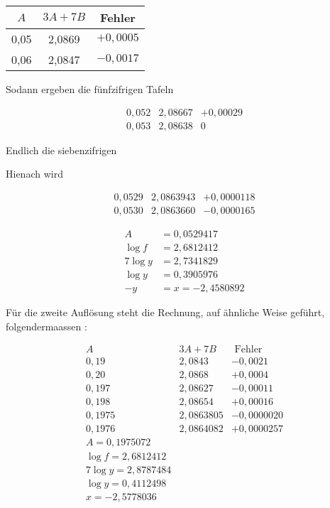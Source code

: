 \documentclass[twoside,12pt, showframe]{memoir}
\begin{document}
\begin{center}
\begin{tabular}{c|c|c}
\(A\) & \(3 A+7 B\) & Fehler \\
\hline
0,05 & 2,0869 & \(+0,0005\) \\
0,06 & 2,0847 & \(-0,0017\) \\
\end{tabular}
\end{center}

Sodann ergeben die fünfzifrigen Tafeln

\[
\begin{array}{l|l|c}
0,052 & 2,08667 & +0,00029 \\
0,053 & 2,08638 & 0
\end{array}
\]

Endlich die siebenzifrigen

Hienach wird

\[
\begin{array}{l|l|l}
0,0529 & 2,0863943 & +0,0000118 \\
0,0530 & 2,0863660 & -0,0000165
\end{array}
\]

\[
\begin{aligned}
A & =0,0529417 \\
\log f & =2,6812412 \\
7 \log y & =2,7341829 \\
\log y & =0,3905976 \\
-y & =x=-2,4580892
\end{aligned}
\]

Für die zweite Auflösung steht die Rechnung, auf ähnliche Weise geführt, folgendermaassen :

\[
\begin{array}{c|c|c}
A & 3 A+7 B & \text { Fehler } \\
\hline 0,19 & 2,0843 & -0,0021 \\
0,20 & 2,0868 & +0,0004 \\
0,197 & 2,08627 & -0,00011 \\
0,198 & 2,08654 & +0,00016 \\
0,1975 & 2,0863805 & -0,0000020 \\
0,1976 & 2,0864082 & +0,0000257 \\
A=0,1975072 \\
\log f=2,6812412 \\
\hline 7 \log y=2,8787484 \\
\log y=0,4112498 \\
x=-2,5778036
\end{array}
\]
\end{document}
